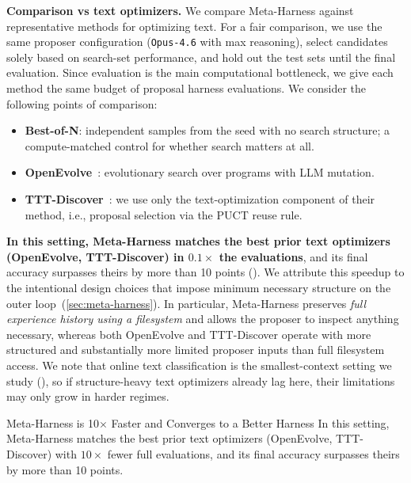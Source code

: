 \documentclass{article}
\begin{document}
\textbf{Comparison vs text optimizers.}
We compare Meta-Harness against representative methods for optimizing text.
For a fair comparison, we use the same proposer configuration (\texttt{Opus-4.6} with max reasoning), select candidates solely based on search-set performance, and hold out the test sets until the final evaluation.
Since evaluation is the main computational bottleneck, we give each method the same budget of proposal harness evaluations.
We consider the following points of comparison:
\begin{itemize}[leftmargin=*,noitemsep,topsep=0pt]
  \item \textbf{Best-of-N}: independent samples from the seed with no search structure; a compute-matched control for whether search matters at all.
  \item \textbf{OpenEvolve}~\citep{openevolve}: evolutionary search over programs with LLM mutation.
  \item \textbf{TTT-Discover}~\citep{yuksekgonul2026learning}: we use only the text-optimization component of their method, i.e., proposal selection via the PUCT reuse rule.
\end{itemize}
\textbf{In this setting, Meta-Harness matches the best prior text optimizers (OpenEvolve, TTT-Discover) in $0.1\times$ the evaluations}, and its final accuracy surpasses theirs by more than 10 points ().
We attribute this speedup to the intentional design choices that impose minimum necessary structure on the outer loop~(\cref{sec:meta-harness}).
In particular, Meta-Harness preserves \textit{full experience history using a filesystem} and allows the proposer to inspect anything necessary, whereas both OpenEvolve and TTT-Discover operate with more structured and substantially more limited proposer inputs than full filesystem access.
We note that online text classification is the smallest-context setting we study (), so if structure-heavy text optimizers already lag here, their limitations may only grow in harder regimes.

\vspace{2mm}
\begin{takeawaybox}{Meta-Harness is 10$\times$ Faster and Converges to a Better Harness}
In this setting, Meta-Harness matches the best prior text optimizers (OpenEvolve, TTT-Discover) with $10\times$ fewer full evaluations, and its final accuracy surpasses theirs by more than 10 points.
\end{takeawaybox}
\vspace{2mm}
\end{document}

